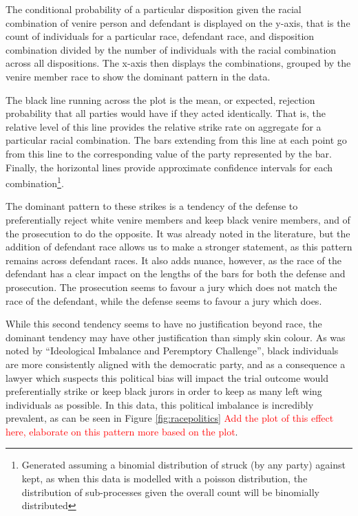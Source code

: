 The conditional probability of a particular disposition given the racial combination of venire person and defendant is displayed
on the y-axis, that is the count of individuals for a particular race, defendant race, and disposition combination divided by the
number of individuals with the racial combination across all dispositions. The x-axis then displays the combinations, grouped by
the venire member race to show the dominant pattern in the data.

The black line running across the plot is the mean, or expected, rejection probability that all parties would have if they acted
identically. That is, the relative level of this line provides the relative strike rate on aggregate for a particular racial
combination. The bars extending from this line at each point go from this line to the corresponding value of the party represented
by the bar. Finally, the horizontal lines provide approximate confidence intervals for each combination\footnote{Generated
  assuming a binomial distribution of struck (by any party) against kept, as when this data is modelled with a poisson
  distribution, the distribution of sub-processes given the overall count will be binomially distributed}.

The dominant pattern to these strikes is a tendency of the defense to preferentially reject white venire members and keep black
venire members, and of the prosecution to do the opposite. It was already noted in the literature\cite{JurySunshineProj}, but the
addition of defendant race allows us to make a stronger statement, as this pattern remains across defendant races. It also adds
nuance, however, as the race of the defendant has a clear impact on the lengths of the bars for both the defense and
prosecution. The prosecution seems to favour a jury which does not match the race of the defendant, while the defense seems to
favour a jury which does.

While this second tendency seems to have no justification beyond race, the dominant tendency may have other justification than
simply skin colour. As was noted by ``Ideological Imbalance and Peremptory Challenge'', black individuals are more consistently
aligned with the democratic party, and as a consequence a lawyer which suspects this political bias will impact the trial outcome
would preferentially strike or keep black jurors in order to keep as many left wing individuals as possible. In this data, this
political imbalance is incredibly prevalent, as can be seen in Figure \ref{fig:racepolitics} \textcolor{red}{Add the plot of this
  effect here, elaborate on this pattern more based on the plot}.

